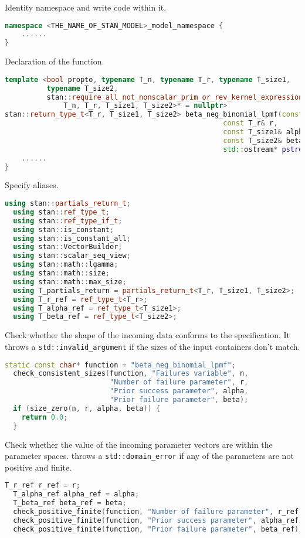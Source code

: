 \documentclass[11pt]{article}
\begin{document}
Identity namespace and write code within it.
\begin{lstlisting}[language=c++, style=lgeneral]
namespace <THE_NAME_OF_STAN_MODEL>_model_namespace {
	......
}
\end{lstlisting}


Declaration of the function.
\begin{lstlisting}[language=c++, style=lgeneral]
template <bool propto, typename T_n, typename T_r, typename T_size1,
          typename T_size2,
          stan::require_all_not_nonscalar_prim_or_rev_kernel_expression_t<
              T_n, T_r, T_size1, T_size2>* = nullptr>
stan::return_type_t<T_r, T_size1, T_size2> beta_neg_binomial_lpmf(const T_n& n,
                                                    const T_r& r,
                                                    const T_size1& alpha,
                                                    const T_size2& beta,
                                                    std::ostream* pstream__) {
	......
}
\end{lstlisting}


Specify aliases.
\begin{lstlisting}[language=c++, style=lgeneral]
  using stan::partials_return_t;
  using stan::ref_type_t;
  using stan::ref_type_if_t;
  using stan::is_constant;
  using stan::is_constant_all;
  using stan::VectorBuilder;
  using stan::scalar_seq_view;
  using stan::math::lgamma;
  using stan::math::size;
  using stan::math::max_size;
  using T_partials_return = partials_return_t<T_r, T_size1, T_size2>;
  using T_r_ref = ref_type_t<T_r>;
  using T_alpha_ref = ref_type_t<T_size1>;
  using T_beta_ref = ref_type_t<T_size2>;
\end{lstlisting}



Check whether the shape of the incoming data conforms to the specification. It throws a \verb|std::invalid_argument| if the sizes of the input containers don't match.
\begin{lstlisting}[language=c++, style=lgeneral]
  static const char* function = "beta_neg_binomial_lpmf";
  check_consistent_sizes(function, "Failures variable", n,
                         "Number of failure parameter", r,
                         "Prior success parameter", alpha,
                         "Prior failure parameter", beta);
  if (size_zero(n, r, alpha, beta)) {
    return 0.0;
  }
\end{lstlisting}



Check whether the value of the incoming parameter vectors are within the parameter spaces.  throws a \verb|std::domain_error| if any of the parameters are not positive and finite.
\begin{lstlisting}[language=c++, style=lgeneral]
  T_r_ref r_ref = r;
  T_alpha_ref alpha_ref = alpha;
  T_beta_ref beta_ref = beta;
  check_positive_finite(function, "Number of failure parameter", r_ref);
  check_positive_finite(function, "Prior success parameter", alpha_ref);
  check_positive_finite(function, "Prior failure parameter", beta_ref);
\end{lstlisting}
\end{document}
